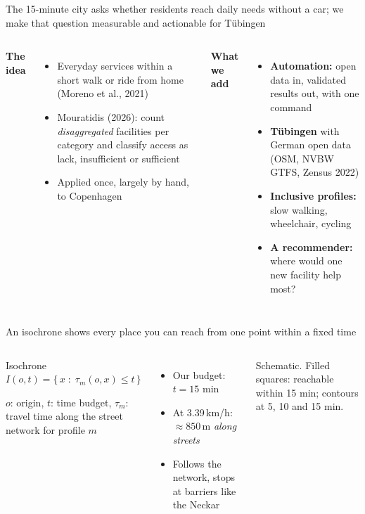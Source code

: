 \documentclass[aspectratio=169,10pt]{beamer}
\begin{document}
\begin{frame}{The 15-minute city asks whether residents reach daily needs without a car; we
  make that question measurable and actionable for Tübingen}
  \begin{columns}[T,onlytextwidth]
      \textbf{The idea}\par\smallskip
      \begin{itemize}
        \item Everyday services within a short walk or ride from home
              (Moreno et al., 2021)
        \item Mouratidis (2026): count \emph{disaggregated} facilities per category and classify
              access as lack, insufficient or sufficient
        \item Applied once, largely by hand, to Copenhagen
      \end{itemize}
      \textbf{What we add}\par\smallskip
      \begin{itemize}
        \item \textbf{Automation:} open data in, validated results out, with one command
        \item \textbf{Tübingen} with German open data (OSM, NVBW GTFS, Zensus 2022)
        \item \textbf{Inclusive profiles:} slow walking, wheelchair, cycling
        \item \textbf{A recommender:} where would one new facility help most?
      \end{itemize}
  \end{columns}
\end{frame}

\begin{frame}{An isochrone shows every place you can reach from one point within a fixed time}
  \begin{columns}[T,onlytextwidth]
      \begin{block}{Isochrone}
        \centering $I(o,t) = \{\,x \;:\; \tau_m(o,x) \le t\,\}$\par\smallskip
        \raggedright\footnotesize $o$: origin, $t$: time budget, $\tau_m$: travel time
        along the street network for profile $m$
      \end{block}
      \smallskip
      \begin{itemize}\small
        \item Our budget: $t = 15$ min
        \item At 3.39\,km/h: $\approx 850$\,m \emph{along streets}
        \item Follows the network, stops at barriers like the Neckar
      \end{itemize}
      \centering\isochronedefinition\par
      {\tiny\color{muted}Schematic. Filled squares: reachable within 15 min; contours at 5, 10
      and 15 min.}
  \end{columns}
\end{frame}
\end{document}
